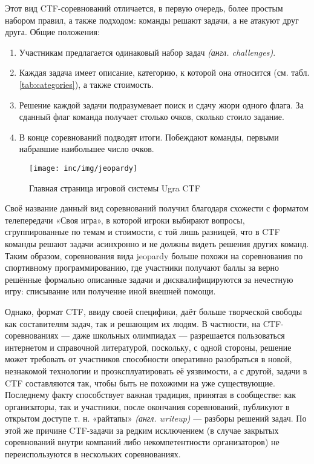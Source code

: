 Этот вид CTF-соревнований отличается, в первую очередь, более простым набором правил, а также подходом: команды решают задачи, а не атакуют друг друга. Общие положения:

\begin{enumerate}
  \item Участникам предлагается одинаковый набор задач \textit{(англ. challenges)}.
  \item Каждая задача имеет описание, категорию, к которой она относится (см. табл. \ref{tab:categories}), а также стоимость.
  \item Решение каждой задачи подразумевает поиск и сдачу жюри одного флага. За сданный флаг команда получает столько очков, сколько стоило задание.
  \item В конце соревнований подводят итоги. Побеждают команды, первыми набравшие наибольшее число очков.
\end{enumerate}

\begin{figure}
  \centering
  \texttt{[image: inc/img/jeopardy]}
  \caption{Главная страница игровой системы Ugra CTF}
  \label{fig:jeopardy}
\end{figure}


Своё название данный вид соревнований получил благодаря схожести с форматом телепередачи «Своя игра», в которой игроки выбирают вопросы, сгруппированные по темам и стоимости, с той лишь разницей, что в CTF команды решают задачи асинхронно и не должны видеть решения других команд. Таким образом, соревнования вида jeopardy больше похожи на соревнования по спортивному программированию, где участники получают баллы за верно решённые формально описанные задачи и дисквалифицируются за нечестную игру: списывание или получение иной внешней помощи.

Однако, формат CTF, ввиду своей специфики, даёт больше творческой свободы как составителям задач, так и решающим их людям. В частности, на CTF-соревнованиях --- даже школьных олимпиадах --- разрешается пользоваться интернетом и справочной литературой, поскольку, с одной стороны, решение может требовать от участников способности оперативно разобраться в новой, незнакомой технологии и проэксплуатировать её уязвимости, а с другой, задачи в CTF составляются так, чтобы быть не похожими на уже существующие. Последнему факту способствует важная традиция, принятая в сообществе: как организаторы, так и участники, после окончания соревнований, публикуют в открытом доступе т. н. «райтапы» \textit{(англ. writeup)} --- разборы решений задач. По этой же причине CTF-задачи за редким исключением (в случае закрытых соревнований внутри компаний либо некомпетентности организаторов) не переиспользуются в нескольких соревнованиях.

